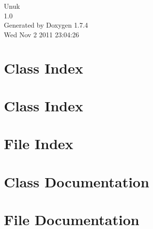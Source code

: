 \documentclass[a4paper]{book}
\begin{document}
\hypersetup{pageanchor=false}
\begin{titlepage}
\vspace*{7cm}
\begin{center}
{\Large Unuk \\[1ex]\large 1.0 }\\
\vspace*{1cm}
{\large Generated by Doxygen 1.7.4}\\
\vspace*{0.5cm}
{\small Wed Nov 2 2011 23:04:26}\\
\end{center}
\end{titlepage}
\clearemptydoublepage
{}
\tableofcontents
\clearemptydoublepage
{}
\hypersetup{pageanchor=true}
\chapter{Class Index}

\chapter{Class Index}

\chapter{File Index}

\chapter{Class Documentation}






















\chapter{File Documentation}

























\printindex
\end{document}
